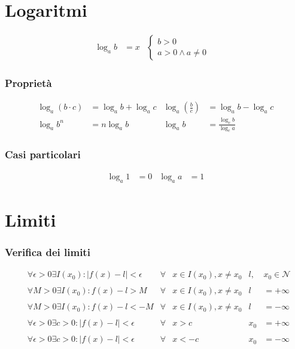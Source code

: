 \documentclass[a4paper]{article}
\begin{document}
	\section{Logaritmi}
	\begin{align*}
		\log_{a}{b} &= x
		&
		\begin{cases}
		b > 0\\
		a > 0 \wedge a \ne 0
		\end{cases}&
	\end{align*}
	
	\subsubsection*{Proprietà}
	\begin{align*}
		\log_{a}(b \cdot c)                 & = \log_{a} b + \log_{a} c &
		\log_{a} \left( \frac{b}{c} \right) & = \log_{a} b - \log_{a} c \\
		\log_{a} b^n                        & = n \log_{a} b		&
		\log_{a} b 							& = \frac{\log_{c} b}{\log_{c} a}
	\end{align*}
	\subsubsection*{Casi particolari}
	\begin{align*}
		\log_{a} 1 &= 0 &
		\log_{a} a &= 1
	\end{align*}
		
	\newpage
	\section{Limiti}
	
	\subsubsection*{Verifica dei limiti}
	\begin{align*}
		&\forall \epsilon > 0 \exists I(x_0) : \left| f(x) - l \right|<\epsilon	&	\forall &x \in I(x_0),x\ne x_0	&	l,&x_0 \in \mathcal{N}\\\\
		&\forall M > 0 \exists I(x_0) : f(x) - l > M	&	\forall &x \in I(x_0),x\ne x_0	&	l &=+\infty\\\\
		&\forall M > 0 \exists I(x_0) : f(x) - l < -M	&	\forall &x \in I(x_0),x\ne x_0	&	l &=-\infty\\\\
		&\forall \epsilon > 0 \exists c>0: \left| f(x) - l \right| < \epsilon	&	\forall &x>c	&	x_0 &= +\infty\\\\
		&\forall \epsilon > 0 \exists c>0: \left| f(x) - l \right| < \epsilon	&	\forall &x<-c	&	x_0 &= -\infty
	\end{align*}
\end{document}
